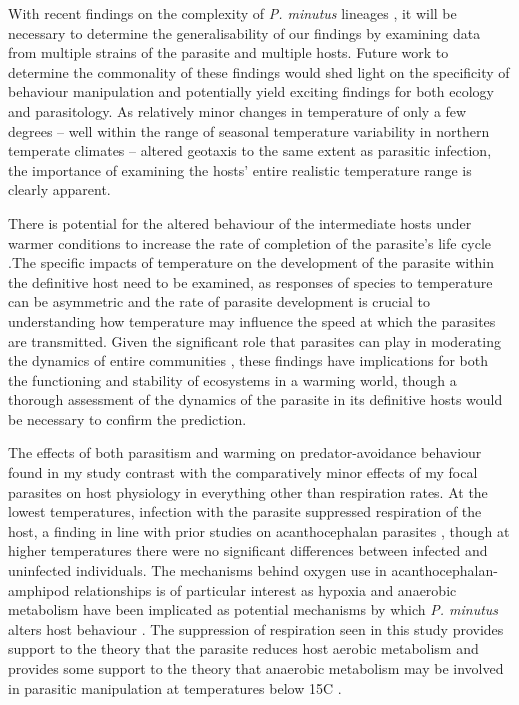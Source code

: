 With recent findings on the complexity of \emph{P. minutus} lineages \citep{zittel2018}, it will be necessary to determine the generalisability of our findings by examining data from multiple strains of the parasite and multiple hosts. Future work to determine the commonality of these findings would shed light on the specificity of behaviour manipulation and potentially yield exciting findings for both ecology and parasitology. As relatively minor changes in temperature of only a few degrees – well within the range of seasonal temperature variability in northern temperate climates – altered geotaxis to the same extent as parasitic infection, the importance of examining the hosts’ entire realistic temperature range is clearly apparent. 

There is potential for the altered behaviour of the intermediate hosts under warmer conditions to increase the rate of completion of the parasite’s life cycle \citep{tierney1993, strepparava2017}.The specific impacts of temperature on the development of the parasite within the definitive host need to be examined, as responses of species to temperature can be asymmetric \citep{dell2014, goedknegt2015} and the rate of parasite development is crucial to understanding how temperature may influence the speed at which the parasites are transmitted. Given the significant role that parasites can play in moderating the dynamics of entire communities \citep{dunne2013}, these findings have implications for both the functioning and stability of ecosystems in a warming world, though a thorough assessment of the dynamics of the parasite in its definitive hosts would be necessary to confirm the prediction.

The effects of both parasitism and warming on predator-avoidance behaviour found in my study contrast with the comparatively minor effects of my focal parasites on host physiology in everything other than respiration rates. At the lowest temperatures, infection with the parasite suppressed respiration of the host, a finding in line with prior studies on acanthocephalan parasites \citep{rumpus1974}, though at higher temperatures there were no significant differences between infected and uninfected individuals. The mechanisms behind oxygen use in acanthocephalan-amphipod relationships is of  particular interest as hypoxia and anaerobic metabolism have been implicated as potential mechanisms by which \emph{P. minutus} alters host behaviour \citep{perrot2016}. The suppression of respiration seen in this study provides support to the theory that the parasite reduces host aerobic metabolism and provides some support to the theory that anaerobic metabolism may be involved in parasitic manipulation at temperatures below 15\degree C . 


